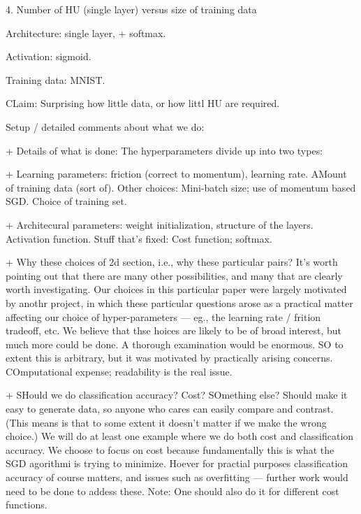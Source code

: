 \documentclass[10pt]{article}
\begin{document}
4. Number of HU (single layer) versus size of training data

Architecture: single layer, + softmax.

Activation: sigmoid.

Training data: MNIST.


CLaim: Surprising how little data, or how littl HU are required.








Setup / detailed comments about what we do: 

+ Details of what is done: The hyperparameters divide up into two types:

+ Learning parameters: friction (correct to momentum), learning rate.
AMount of training data (sort of).  Other choices: Mini-batch size;
use of momentum based SGD.  Choice of training set.

+ Architecural parameters: weight initialization, structure of the
layers.  Activation function.  Stuff that's fixed: Cost function;
softmax.

+ Why these choices of 2d section, i.e., why these particular pairs?
It's worth pointing out that there are many other possibilities, and
many that are clearly worth investigating.  Our choices in this
particular paper were largely motivated by anothr project, in which
these particular questions arose as a practical matter affecting our
choice of hyper-parameters --- eg., the learning rate / frition
tradeoff, etc.  We believe that thse hoices are likely to be of broad
interest, but much more could be done.  A thorough examination would
be enormous.  SO to extent this is arbitrary, but it was motivated by
practically arising concerns.  COmputational expense; readability is
the real issue.


+ SHould we do classification accuracy?  Cost?  SOmething else?
Should make it easy to generate data, so anyone who cares can easily
compare and contrast.  (This means is that to some extent it doesn't
matter if we make the wrong choice.)  We will do at least one example
where we do both cost and classification accuracy.  We choose to focus
on cost because fundamentally this is what the SGD agorithmi is trying
to minimize.  Hoever for practial purposes classification accuracy of
course matters, and issues such as overfitting --- further work would
need to be done to addess these.  Note: One should also do it for
different cost functions.
\end{document}
